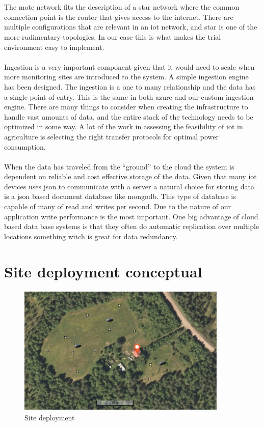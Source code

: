 \documentclass[]{uiophd}
\begin{document}
\\\\
The mote network fits the description of a star network where the common connection point is the router that gives access to the internet. There are multiple configurations that are relevant in an iot network, and star is one of the more rudimentary topologies. In our case this is what makes the trial environment easy to implement.
\\\\
Ingestion is a very important component given that it would need to scale when more monitoring sites are introduced to the system. A simple ingestion engine has been designed. The ingestion is a one to many relationship and the data has a single point of entry. This is the same in both azure and our custom ingestion engine. There are many things to consider when creating the infrastructure to handle vast amounts of data, and the entire stack of the technology needs to be optimized in some way. A lot of the work in assessing the feasibility of iot in agriculture is selecting the right transfer protocols for optimal power consumption.
\\\\
 When the data has traveled from the “ground” to the cloud the system is dependent on reliable and cost effective storage of the data. Given that many iot devices uses json to communicate with a server a natural choice for storing data is a json based document database like mongodb. This type of database is capable of many of read and writes per second. Due to the nature of our application write performance is the most important. One big advantage of cloud based data base systems is that they often do automatic replication over multiple locations something witch is great for data redundancy.
 
 \section{Site deployment conceptual}
 \begin{figure}[h]
\caption{Site deployment}
\centering
\includegraphics[width=10cm]{hjemly.png}
\end{figure}
\end{document}
